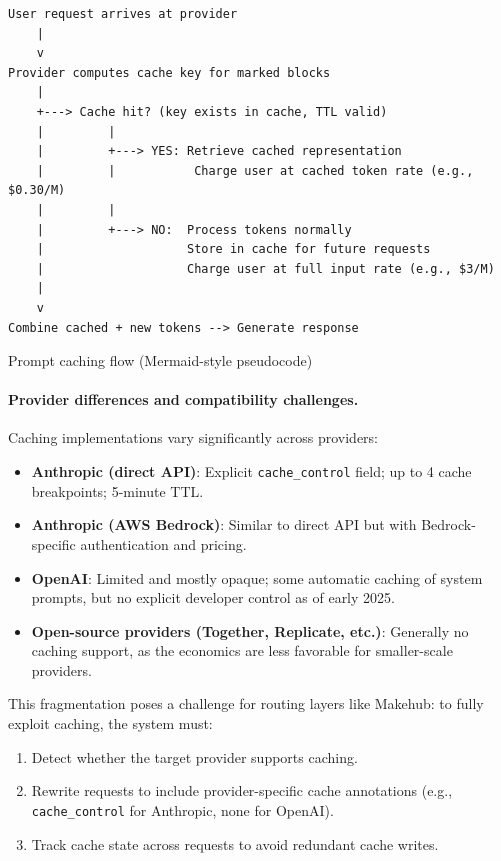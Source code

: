\documentclass[english]{article}
\begin{document}
\begin{listing}[H]
\begin{verbatim}
User request arrives at provider
    |
    v
Provider computes cache key for marked blocks
    |
    +---> Cache hit? (key exists in cache, TTL valid)
    |         |
    |         +---> YES: Retrieve cached representation
    |         |           Charge user at cached token rate (e.g., $0.30/M)
    |         |
    |         +---> NO:  Process tokens normally
    |                    Store in cache for future requests
    |                    Charge user at full input rate (e.g., $3/M)
    |
    v
Combine cached + new tokens --> Generate response
\end{verbatim}
\caption{Prompt caching flow (Mermaid-style pseudocode)}
\end{listing}

\paragraph{Provider differences and compatibility challenges.}

Caching implementations vary significantly across providers:
\begin{itemize}
    \item \textbf{Anthropic (direct API)}: Explicit \texttt{cache\_control} field; up to 4 cache breakpoints; 5-minute TTL.
    \item \textbf{Anthropic (AWS Bedrock)}: Similar to direct API but with Bedrock-specific authentication and pricing.
    \item \textbf{OpenAI}: Limited and mostly opaque; some automatic caching of system prompts, but no explicit developer control as of early 2025.
    \item \textbf{Open-source providers (Together, Replicate, etc.)}: Generally no caching support, as the economics are less favorable for smaller-scale providers.
\end{itemize}

This fragmentation poses a challenge for routing layers like Makehub: to fully exploit caching, the system must:
\begin{enumerate}
    \item Detect whether the target provider supports caching.
    \item Rewrite requests to include provider-specific cache annotations (e.g., \texttt{cache\_control} for Anthropic, none for OpenAI).
    \item Track cache state across requests to avoid redundant cache writes.
\end{enumerate}
\end{document}
